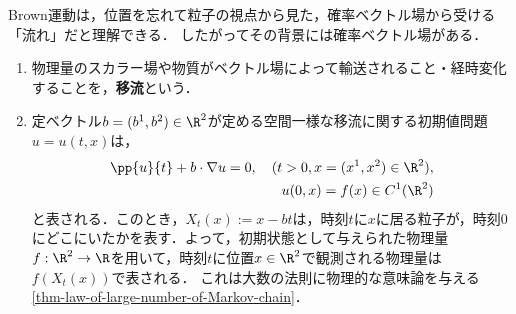 \documentclass[uplatex,dvipdfmx]{jsreport}
\begin{document}
\begin{tcolorbox}[colframe=ForestGreen, colback=ForestGreen!10!white,breakable,colbacktitle=ForestGreen!40!white,coltitle=black,fonttitle=\bfseries\sffamily,
title=]
    Brown運動は，位置を忘れて粒子の視点から見た，確率ベクトル場から受ける「流れ」だと理解できる．
    したがってその背景には確率ベクトル場がある．
\end{tcolorbox}

\begin{definition}\mbox{}
    \begin{enumerate}
        \item 物理量のスカラー場や物質がベクトル場によって輸送されること・経時変化することを，\textbf{移流}という．
        \item 定ベクトル$b=(b^1,b^2)\in\R^2$が定める空間一様な移流に関する初期値問題$u=u(t,x)$は，
        \begin{align*}
            \pp{u}{t}+b\cdot\nabla u=0,\quad(t>0,x=(x^1,x^2)\in\R^2),\\
            u(0,x)=f(x)\in C^1(\R^2)
        \end{align*}
        と表される．このとき，$X_t(x):=x-bt$は，時刻$t$に$x$に居る粒子が，時刻$0$にどこにいたかを表す．よって，初期状態として与えられた物理量$f:\R^2\to\R$を用いて，時刻$t$に位置$x\in\R^2$で観測される物理量は$f(X_t(x))$で表される．
        これは大数の法則に物理的な意味論を与える\ref{thm-law-of-large-number-of-Markov-chain}．
    \end{enumerate}
\end{definition}
\end{document}
